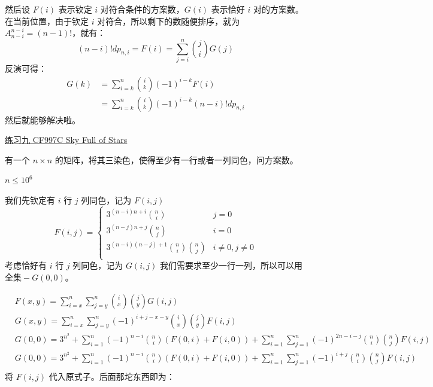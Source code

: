 \documentclass[UTF8]{beamer}
\begin{document}
    \begin{frame}
      然后设 \(F(i)\) 表示钦定 \(i\) 对符合条件的方案数，\(G(i)\) 表示恰好
      \(i\) 对的方案数。在当前位置，由于钦定 \(i\)
      对符合，所以剩下的数随便排序，就为 \(A_{n-i}^{n-i}=(n-1)!\)，就有： 
      \[
      (n-i)!dp_{n,i}=F(i)=\sum\limits_{j=i}^{n}{j \choose i}G(j)
      \] 
      \pause
      反演可得： 
      \[
      \begin{aligned}
      G( k)&=\sum\limits_{i=k}^{n}{i \choose k}(-1)^{i-k}F(i) \\
      &=\sum\limits_{i=k}^{n}{i \choose k}(-1)^{i-k}(n-i)!dp_{n,i}
      \end{aligned}
      \] 然后就能够解决啦。
    \end{frame}

    \begin{frame}
      \begin{block}{\href{https://www.luogu.com.cn/problem/CF997C}{练习九 CF997C Sky Full of
      Stars}}

      有一个 \(n\times n\)
      的矩阵，将其三染色，使得至少有一行或者一列同色，问方案数。

      \(n\leq10^6\)
      \end{block}
      \pause
      我们先钦定有 \(i\) 行 \(j\) 列同色，记为 \(F(i,j)\) 
      \[
      F(i,j)=
      \begin{cases}
      3^{(n-i)n+i}{n \choose i} & j=0 \\
      3^{(n-j)n+j}{n \choose j} & i=0 \\
      3^{(n-i)(n-j)+1}{n \choose i}{n \choose j} & i\ne 0,j\ne 0 \\
      \end{cases}
      \] 
      考虑恰好有 \(i\) 行 \(j\) 列同色，记为 \(G(i,j)\)
      我们需要求至少一行一列，所以可以用 \(全集-G(0,0)\)。
    \end{frame}

    \begin{frame}
      \[
      \begin{aligned}
      &F(x,y)=\sum\limits_{i=x}^{n}\sum\limits_{j=y}^{n}{i \choose x}{j \choose y}G(i,j) \\
      &G(x,y)=\sum\limits_{i=x}^{n}\sum\limits_{j=y}^{n}(-1)^{i+j-x-y}{i \choose x}{j \choose y}F(i,j) \\
      &G(0,0)=3^{n^2}+\sum\limits_{i=1}^{n}(-1)^{n-i}{n \choose i}(F(0,i)+F(i,0))+\sum\limits_{i=1}^{n}\sum\limits_{j=1}^{n}(-1)^{2n-i-j}{n \choose i}{n \choose j}F(i,j) \\
      &G(0,0)=3^{n^2}+\sum\limits_{i=1}^{n}(-1)^{n-i}{n \choose i}(F(0,i)+F(i,0))+\sum\limits_{i=1}^{n}\sum\limits_{j=1}^{n}(-1)^{i+j}{n \choose i}{n \choose j}F(i,j) \\
      \end{aligned}
      \]
      \pause
      将 \(F(i,j)\) 代入原式子。后面那坨东西即为： 
    \end{frame}
\end{document}
